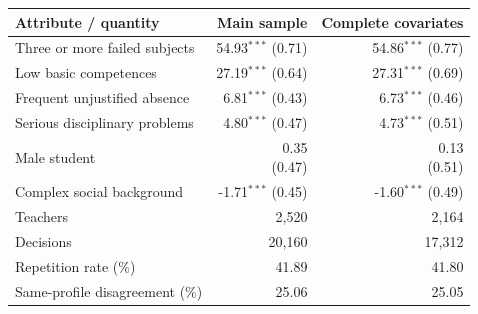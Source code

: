 \begin{tabular}{p{6.4cm}rr}
\toprule
Attribute / quantity & Main sample & Complete covariates \\
\midrule
Three or more failed subjects & \shortstack{54.93$^{***}$\\{\scriptsize (0.71)}} & \shortstack{54.86$^{***}$\\{\scriptsize (0.77)}} \\
Low basic competences & \shortstack{27.19$^{***}$\\{\scriptsize (0.64)}} & \shortstack{27.31$^{***}$\\{\scriptsize (0.69)}} \\
Frequent unjustified absence & \shortstack{6.81$^{***}$\\{\scriptsize (0.43)}} & \shortstack{6.73$^{***}$\\{\scriptsize (0.46)}} \\
Serious disciplinary problems & \shortstack{4.80$^{***}$\\{\scriptsize (0.47)}} & \shortstack{4.73$^{***}$\\{\scriptsize (0.51)}} \\
Male student & \shortstack{0.35\\{\scriptsize (0.47)}} & \shortstack{0.13\\{\scriptsize (0.51)}} \\
Complex social background & \shortstack{-1.71$^{***}$\\{\scriptsize (0.45)}} & \shortstack{-1.60$^{***}$\\{\scriptsize (0.49)}} \\
Teachers & 2,520 & 2,164 \\
Decisions & 20,160 & 17,312 \\
Repetition rate (\%) & 41.89 & 41.80 \\
Same-profile disagreement (\%) & 25.06 & 25.05 \\
\bottomrule
\end{tabular}
